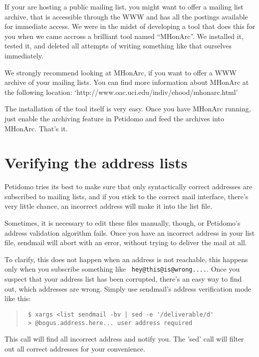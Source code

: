 \documentclass[a4paper,10pt]{scrreprt}
\newcommand{\file}[1]{{\sf #1}}
\begin{document}
If your are hosting a public mailing list, you might want to offer a
mailing list archive, that is accessible through the WWW and has all
the postings available for immediate access. We were in the midst of
developing a tool that does this for you when we came accross a
brilliant tool named ``MHonArc''. We installed it, tested it, and
deleted all attempts of writing something like that ourselves
immediately.

We strongly recommend looking at MHonArc, if you want to offer a WWW
archive of your mailing lists. You can find more information about
MHonArc at the following location:
`http://www.oac.uci.edu/indiv/ehood/mhonarc.html'

The installation of the tool itself is very easy. Once you have
MHonArc running, just enable the archiving feature in Petidomo and
feed the archives into MHonArc. That's it.

\section{Verifying the address lists}

Petidomo tries its best to make sure that only syntactically correct
addresses are subscribed to mailing lists, and if you stick to the
correct mail interface, there's very little chance, an incorrect
address will make it into the \file{list} file.

Sometimes, it is necessary to edit these files manually, though, or
Petidomo's address validation algorithm fails. Once you have an
incorrect address in your list file, sendmail will abort with an
error, without trying to deliver the mail at all.

To clarify, this does not happen when an address is not reachable,
this happens only when you subscribe something like {\tt
hey@this@is@wrong....}. Once you suspect that your address list has
been corrupted, there's an easy way to find out, which addresses are
wrong. Simply use sendmail's address verification mode like this:

\begin{quote}
\begin{verbatim}
 $ xargs <list sendmail -bv | sed -e '/deliverable/d'
 > @bogus.address.here... user address required
\end{verbatim}
\end{quote}

This call will find all incorrect address and notify you. The 'sed'
call will filter out all correct addresses for your convenience.
\end{document}
